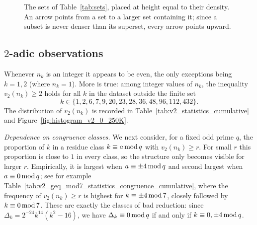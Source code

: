 \documentclass[12pt]{amsart}%
\renewcommand{\pmod}[1]{\hspace{0.05em}(\mathrm{mod}\,#1)}
\newcommand{\1}{\mathds{1}}
\renewcommand{\pmod}[1]{\,{\rm mod}\,#1}
\theoremstyle{definition}
\numberwithin{equation}{section}
\numberwithin{table}{section}
\numberwithin{figure}{section}
\begin{document}
\begin{figure}[h]
  \centering
  \newcommand{\SCALE}{20}%
  \caption{The sets of Table~\ref{tab:sets}, placed at height equal to their density.
  An arrow points from a set to a larger set containing it; since a subset is never
  denser than its superset, every arrow points upward.}
  \label{fig:placeholder}
\end{figure}


\subsection{$2$-adic observations}

Whenever $n_k$ is an integer it appears to be even, the only exceptions being
$k=1,2$ (where $n_k=1$). More is true: among integer values of $n_k$, the
inequality $v_2(n_k)\geq 2$ holds for all $k$ in the dataset outside the finite set
\[
k \in \{1,2,6,7,9,20,23,28,36,48,96,112,432\}.
\]
The distribution of $v_2(n_k)$ is recorded in
Table~\ref{tab:v2_statistics_cumulative} and
Figure~\ref{fig:histogram_v2_0_250K}.


\medskip
\noindent\emph{Dependence on congruence classes.} We next consider, for a fixed odd prime $q$, the proportion of $k$ in a residue
class $k\equiv a \pmod q$ with $v_2(n_k)\geq r$. For small $r$ this proportion
is close to $1$ in every class, so the structure only becomes visible for
larger $r$. Empirically, it is largest when $a\equiv\pm4\pmod q$ and second
largest when $a\equiv 0\pmod q$; see for example
Table~\ref{tab:v2_geq_mod7_statistics_congruence_cumulative}, where the
frequency of $v_2(n_k)\geq r$ is highest for $k\equiv\pm4\pmod 7$, closely
followed by $k\equiv0\pmod 7$. These are exactly the classes of bad reduction:
since $\Delta_k=2^{-24}k^{14}(k^2-16)$, we have
$\Delta_k\equiv0\pmod q$ if and only if $k\equiv 0,\pm4\pmod q$.
\end{document}
